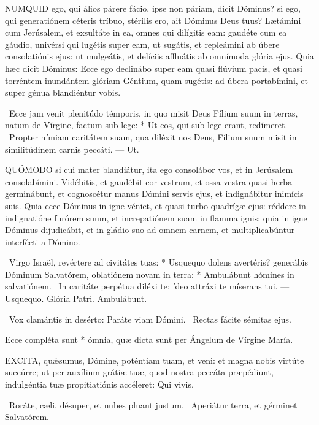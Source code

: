
\lettrine[lines=2]{N}{UMQUID} ego, qui álios párere fácio, ipse non páriam, dicit Dóminus? si ego, qui generatiónem céteris tríbuo, stérilis ero, ait Dóminus Deus tuus? Lætámini cum Jerúsalem, et exsultáte in ea, omnes qui dilígitis eam: gaudéte cum ea gáudio, univérsi qui lugétis super eam, ut sugátis, et repleámini ab úbere consolatiónis ejus: ut mulgeátis, et delíciis affluátis ab omnímoda glória ejus. Quia hæc dicit Dóminus: Ecce ego declinábo super eam quasi flúvium pacis, et quasi torréntem inundántem glóriam Géntium, quam sugétis: ad úbera portabímini, et super génua blandiéntur vobis.

\R\ Ecce jam venit plenitúdo témporis, in quo misit Deus Fílium suum in terras, natum de Vírgine, factum sub lege: * Ut eos, qui sub lege erant, redímeret. \V\ Propter nímiam caritátem suam, qua diléxit nos Deus, Fílium suum misit in similitúdinem carnis peccáti. --- Ut.


\lettrine[lines=2]{Q}{UÓMODO} si cui mater blandiátur, ita ego consolábor vos, et in Jerúsalem consolabímini. Vidébitis, et gaudébit cor vestrum, et ossa vestra quasi herba germinábunt, et cognoscétur manus Dómini servis ejus, et indignábitur inimícis suis. Quia ecce Dóminus in igne véniet, et quasi turbo quadrígæ ejus: réddere in indignatióne furórem suum, et increpatiónem suam in flamma ignis: quia in igne Dóminus dijudicábit, et in gládio suo ad omnem carnem, et multiplicabúntur interfécti a Dómino.

\R\ Virgo Israël, revértere ad civitátes tuas: * Usquequo dolens avertéris? generábis Dóminum Salvatórem, oblatiónem novam in terra: * Ambulábunt hómines in salvatiónem. \V\ In caritáte perpétua diléxi te: ídeo attráxi te míserans tui. --- Usquequo. Glória Patri. Ambulábunt.

\V\ Vox clamántis in desérto: Paráte viam Dómini. \R\ Rectas fácite sémitas ejus.

 Ecce compléta sunt * ómnia, quæ dicta sunt per Ángelum de Vírgine María.


\lettrine[lines=2]{E}{XCITA}, quǽsumus, Dómine, poténtiam tuam, et veni: et magna nobis virtúte succúrre; ut per auxílium grátiæ tuæ, quod nostra peccáta præpédiunt, indulgéntia tuæ propitiatiónis accéleret: Qui vivis.

\V\ Roráte, cæli, désuper, et nubes pluant justum. \R\ Aperiátur terra, et gérminet Salvatórem.


